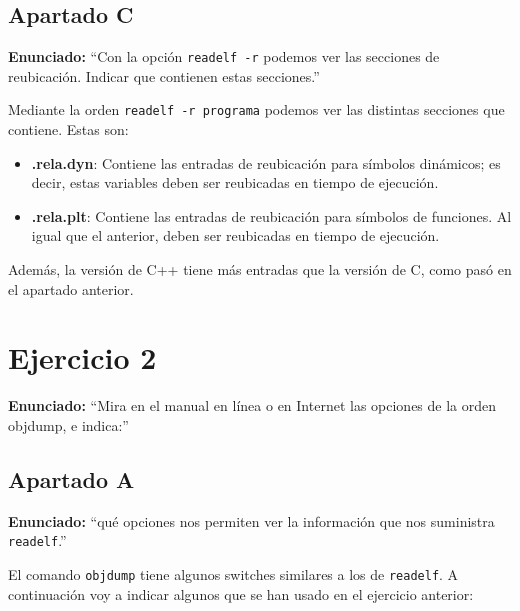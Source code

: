 \documentclass{article}
\begin{document}
\newpage

{}
\subsection*{Apartado C}

\textbf{Enunciado: }``Con la opción \texttt{readelf -r} podemos ver las secciones de reubicación. Indicar que contienen estas secciones.''

\bigskip

Mediante la orden \verb|readelf -r programa| podemos ver las distintas secciones que contiene. Estas son:

\begin{itemize}
    \item \textbf{.rela.dyn}: Contiene las entradas de reubicación para símbolos dinámicos; es decir, estas variables deben ser reubicadas en tiempo de ejecución.
    \item \textbf{.rela.plt}: Contiene las entradas de reubicación para símbolos de funciones. Al igual que el anterior, deben ser reubicadas en tiempo de ejecución.
\end{itemize}

Además, la versión de C++ tiene más entradas que la versión de C, como pasó en el apartado anterior.

\bigskip

{}
\section*{Ejercicio 2}

\textbf{Enunciado: }``Mira en el manual en línea o en Internet las opciones de la orden objdump, e indica:''

{}
\subsection*{Apartado A}

\textbf{Enunciado: }``qué opciones nos permiten ver la información que nos suministra \texttt{readelf}.''

\bigskip

El comando \verb|objdump| tiene algunos switches similares a los de \verb|readelf|. A continuación voy a indicar algunos que se han usado en el ejercicio anterior:
\end{document}
